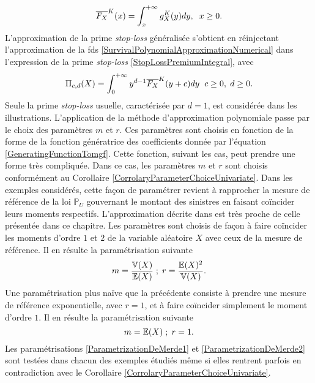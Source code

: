 \begin{equation}\label{SurvivalPolynomialApproximationNumerical}
\overline{F_{X}}^{K}(x)=\int_{x}^{+\infty}g_{X}^{K}(y)dy,\hspace{0.2cm}x\geq0.
\end{equation}
L\rq{}approximation de la prime \textit{stop-loss} généralisée s\rq{}obtient en réinjectant l\rq{}approximation de la \gls{fds} \eqref{SurvivalPolynomialApproximationNumerical} dans l\rq{}expression de la prime \textit{stop-loss} \eqref{StopLossPremiumIntegral}, avec 
\begin{equation}\label{StopLossPolynomialApproximationNumerical}
\Pi_{c,d}(X)=\int_{0}^{+\infty}y^{d-1}\overline{F_{X}}^{K}(y+c)dy\hspace{0.2cm}c\geq0,\hspace{0.1cm}d\geq0.
\end{equation}
Seule la prime \textit{stop-loss} usuelle, caractérisée par $d=1$, est considérée dans les illustrations. L\rq{}application de la méthode d\rq{}approximation polynomiale passe par le choix des paramètres $m$ et $r$. Ces paramètres sont choisis en fonction de la forme de la fonction génératrice des coefficients donnée par l'équation \eqref{GeneratingFunctionTomgf}. Cette fonction, suivant les cas, peut prendre une forme très compliquée. Dans ce cas, les paramètres $m$ et $r$ sont choisis conformément au Corollaire \ref{CorrolaryParameterChoiceUnivariate}. Dans les exemples considérés, cette façon de paramétrer revient à rapprocher la mesure de référence de la loi $\mathbb{P}_{U}$ gouvernant le montant des sinistres en faisant coïncider leurs moments respectifs. L'approximation décrite dans \citet{JiPrRe14} est très proche de celle présentée dans ce chapitre. Les paramètres sont choisis de façon à faire coïncider les moments d'ordre $1$ et $2$ de la variable aléatoire $X$ avec ceux de la mesure de référence. Il en résulte la paramétrisation suivante 
\begin{equation}\label{ParametrizationDeMerde1}
m=\frac{\mathbb{V}(X)}{\mathbb{E}(X)}\hspace{0.1cm};\hspace{0.1cm} r=\frac{\mathbb{E}(X)^{2}}{\mathbb{V}(X)}.
\end{equation} 
Une paramétrisation plus naïve que la précédente consiste à prendre une mesure de référence exponentielle, avec $r=1$, et à faire coïncider simplement le moment d'ordre $1$. Il en résulte la paramétrisation suivante 
\begin{equation}\label{ParametrizationDeMerde2}
m=\mathbb{E}(X)\hspace{0.1cm};\hspace{0.1cm} r=1.
\end{equation}
Les paramétrisations \eqref{ParametrizationDeMerde1} et \eqref{ParametrizationDeMerde2} sont testées dans chacun des exemples étudiés même si elles rentrent parfois en contradiction avec le Corollaire \ref{CorrolaryParameterChoiceUnivariate}.
\\

